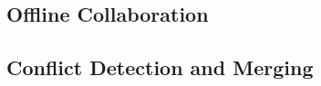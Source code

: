 \documentclass{template/openetcs_article}
\begin{document}
\subsection{Offline Collaboration}
\label{sec:offcollaboration}

\subsection{Conflict Detection and Merging}
\label{sec:conflict}
\end{document}

